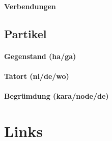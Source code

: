 \documentclass[justified, a4paper, notitlepage, captions=tableheading, nobib]{tufte-handout}
\begin{document}
\paragraph{Verbendungen}
\label{sec:org3aed703}

\subsection{Partikel }
\label{sec:org8a31caf}

\paragraph{Gegenstand (ha/ga)}
\label{sec:orgd1d327b}

\paragraph{Tatort (ni/de/wo)}
\label{sec:org41c08c8}

\paragraph{Begrümdung (kara/node/de)}
\label{sec:org69ba1d5}

\section{Links}
\label{sec:org299c174}


\newpage

\nocite{*}
\printbibliography
{}
\end{document}
